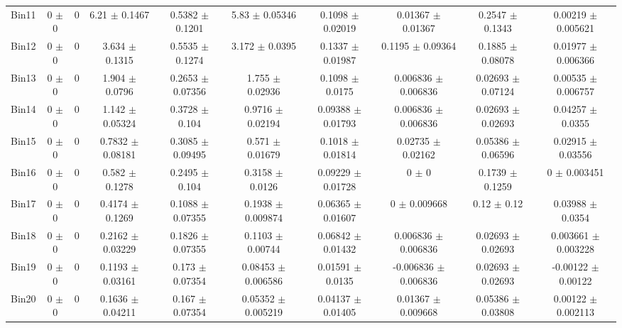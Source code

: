 \begin{tabular}{@{\extracolsep{4pt}}lccccccccc@{}}
     Bin11 & 0 $\pm$ 0 & 0 & 6.21 $\pm$ 0.1467 & 0.5382 $\pm$ 0.1201 & 5.83 $\pm$ 0.05346 & 0.1098 $\pm$ 0.02019 & 0.01367 $\pm$ 0.01367 & 0.2547 $\pm$ 0.1343 & 0.00219 $\pm$ 0.005621 \\ 
     Bin12 & 0 $\pm$ 0 & 0 & 3.634 $\pm$ 0.1315 & 0.5535 $\pm$ 0.1274 & 3.172 $\pm$ 0.0395 & 0.1337 $\pm$ 0.01987 & 0.1195 $\pm$ 0.09364 & 0.1885 $\pm$ 0.08078 & 0.01977 $\pm$ 0.006366 \\ 
     Bin13 & 0 $\pm$ 0 & 0 & 1.904 $\pm$ 0.0796 & 0.2653 $\pm$ 0.07356 & 1.755 $\pm$ 0.02936 & 0.1098 $\pm$ 0.0175 & 0.006836 $\pm$ 0.006836 & 0.02693 $\pm$ 0.07124 & 0.00535 $\pm$ 0.006757 \\ 
     Bin14 & 0 $\pm$ 0 & 0 & 1.142 $\pm$ 0.05324 & 0.3728 $\pm$ 0.104 & 0.9716 $\pm$ 0.02194 & 0.09388 $\pm$ 0.01793 & 0.006836 $\pm$ 0.006836 & 0.02693 $\pm$ 0.02693 & 0.04257 $\pm$ 0.0355 \\ 
     Bin15 & 0 $\pm$ 0 & 0 & 0.7832 $\pm$ 0.08181 & 0.3085 $\pm$ 0.09495 & 0.571 $\pm$ 0.01679 & 0.1018 $\pm$ 0.01814 & 0.02735 $\pm$ 0.02162 & 0.05386 $\pm$ 0.06596 & 0.02915 $\pm$ 0.03556 \\ 
     Bin16 & 0 $\pm$ 0 & 0 & 0.582 $\pm$ 0.1278 & 0.2495 $\pm$ 0.104 & 0.3158 $\pm$ 0.0126 & 0.09229 $\pm$ 0.01728 & 0 $\pm$ 0 & 0.1739 $\pm$ 0.1259 & 0 $\pm$ 0.003451 \\ 
     Bin17 & 0 $\pm$ 0 & 0 & 0.4174 $\pm$ 0.1269 & 0.1088 $\pm$ 0.07355 & 0.1938 $\pm$ 0.009874 & 0.06365 $\pm$ 0.01607 & 0 $\pm$ 0.009668 & 0.12 $\pm$ 0.12 & 0.03988 $\pm$ 0.0354 \\ 
     Bin18 & 0 $\pm$ 0 & 0 & 0.2162 $\pm$ 0.03229 & 0.1826 $\pm$ 0.07355 & 0.1103 $\pm$ 0.00744 & 0.06842 $\pm$ 0.01432 & 0.006836 $\pm$ 0.006836 & 0.02693 $\pm$ 0.02693 & 0.003661 $\pm$ 0.003228 \\ 
     Bin19 & 0 $\pm$ 0 & 0 & 0.1193 $\pm$ 0.03161 & 0.173 $\pm$ 0.07354 & 0.08453 $\pm$ 0.006586 & 0.01591 $\pm$ 0.0135 & -0.006836 $\pm$ 0.006836 & 0.02693 $\pm$ 0.02693 & -0.00122 $\pm$ 0.00122 \\ 
     Bin20 & 0 $\pm$ 0 & 0 & 0.1636 $\pm$ 0.04211 & 0.167 $\pm$ 0.07354 & 0.05352 $\pm$ 0.005219 & 0.04137 $\pm$ 0.01405 & 0.01367 $\pm$ 0.009668 & 0.05386 $\pm$ 0.03808 & 0.00122 $\pm$ 0.002113 \\ 
\hline\hline
  \end{tabular}
